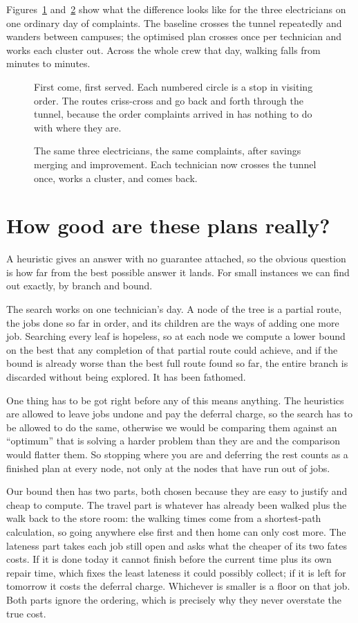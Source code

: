 \documentclass[11pt]{article}
\newcommand{\figbox}[2]{%
  \begin{figure}[t]\centering
  \resizebox{\linewidth}{!}{}
  \caption{#2}\label{fig:#1}\end{figure}}
\begin{document}
Figures~\ref{fig:routes_fifo} and~\ref{fig:routes_improved} show what the difference looks like
for the three electricians on one ordinary day of \NDayTickets{} complaints.
The baseline crosses the tunnel repeatedly and wanders between campuses; the
optimised plan crosses once per technician and works each cluster out. Across
the whole crew that day, walking falls from \NDayFifoTravel{} minutes to
\NDayImpTravel{} minutes.

\figbox{routes_fifo}{First come, first served. Each numbered circle is a stop
in visiting order. The routes criss-cross and go back and forth through the
tunnel, because the order complaints arrived in has nothing to do with where
they are.}

\figbox{routes_improved}{The same three electricians, the same complaints,
after savings merging and improvement. Each technician now crosses the tunnel
once, works a cluster, and comes back.}

\section{How good are these plans really?}

A heuristic gives an answer with no guarantee attached, so the obvious
question is how far from the best possible answer it lands. For small
instances we can find out exactly, by branch and bound.

The search works on one technician's day. A node of the tree is a partial
route, the jobs done so far in order, and its children are the ways of adding
one more job. Searching every leaf is hopeless, so at each node we compute a
lower bound on the best that any completion of that partial route could
achieve, and if the bound is already worse than the best full route found so
far, the entire branch is discarded without being explored. It has been
fathomed.

One thing has to be got right before any of this means anything. The
heuristics are allowed to leave jobs undone and pay the deferral charge, so
the search has to be allowed to do the same, otherwise we would be comparing
them against an ``optimum'' that is solving a harder problem than they are
and the comparison would flatter them. So stopping where you are and
deferring the rest counts as a finished plan at every node, not only at the
nodes that have run out of jobs.

Our bound then has two parts, both chosen because they are easy to justify
and cheap to compute. The travel part is whatever has already been walked
plus the walk back to the store room: the walking times come from a
shortest-path calculation, so going anywhere else first and then home can
only cost more. The lateness part takes each job still open and asks what the
cheaper of its two fates costs. If it is done today it cannot finish before
the current time plus its own repair time, which fixes the least lateness it
could possibly collect; if it is left for tomorrow it costs the deferral
charge. Whichever is smaller is a floor on that job. Both parts ignore the
ordering, which is precisely why they never overstate the true cost.
\end{document}
